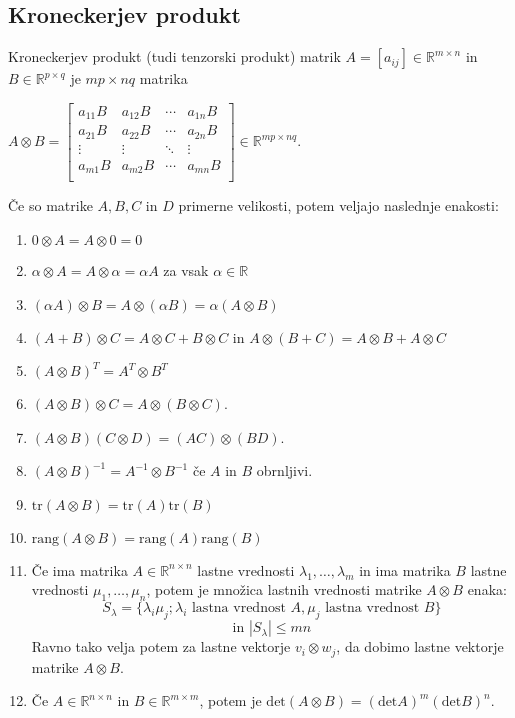 \documentclass{article}
\begin{document}
\begin{multicols}{2}
\subsection{Kroneckerjev produkt}

Kroneckerjev produkt (tudi tenzorski produkt) matrik \( A = [a_{ij}] \in \mathbb{R}^{m \times n} \) in \( B \in \mathbb{R}^{p \times q} \) je \( mp \times nq \) matrika

\begin{math}
A \otimes B = 
\begin{bmatrix}
a_{11}B & a_{12}B & \cdots & a_{1n}B \\
a_{21}B & a_{22}B & \cdots & a_{2n}B \\
\vdots  & \vdots  & \ddots & \vdots  \\
a_{m1}B & a_{m2}B & \cdots & a_{mn}B \\
\end{bmatrix}
\in \mathbb{R}^{mp \times nq}.
\end{math}

Če so matrike $A, B, C$ in $D$ primerne velikosti, potem veljajo naslednje enakosti:
\begin{enumerate}
\item $0 \otimes A = A \otimes 0 = 0$
\item $\alpha \otimes A = A \otimes \alpha = \alpha A$ za vsak $\alpha \in \mathbb{R}$
\item $(\alpha A) \otimes B = A \otimes (\alpha B) = \alpha (A \otimes B)$
\item $(A + B) \otimes C = A \otimes C + B \otimes C$ in $A \otimes (B + C) = A \otimes B + A \otimes C$
\item $(A \otimes B)^T = A^T \otimes B^T$
\item $(A \otimes B) \otimes C = A \otimes (B \otimes C)$.
\item $(A \otimes B)(C \otimes D) = (AC) \otimes (BD)$.
\item $(A \otimes B)^{-1} = A^{-1} \otimes B^{-1}$ če $A$ in $B$ obrnljivi.
\item $\text{tr}(A \otimes B) = \text{tr}(A) \text{tr}(B)$
\item $\text{rang}(A \otimes B) = \text{rang}(A) \text{rang}(B)$
\item Če ima matrika $A \in \mathbb{R}^{n \times n}$ lastne vrednosti $\lambda_1, \ldots, \lambda_m$ in ima matrika $B$ lastne vrednosti $\mu_1, \ldots, \mu_n$, potem je množica lastnih vrednosti matrike $A \otimes B$ enaka:
$$ S_\lambda  = \{ \lambda_i \mu_j; \lambda_i \text{ lastna vrednost } A, \mu_j \text{ lastna vrednost } B\} $$
$$\text{in } |S_\lambda| \leq mn$$
Ravno tako velja potem za lastne vektorje $ v_i \otimes w_j$, da dobimo lastne vektorje matrike $A \otimes B$.
\item Če $A \in \mathbb{R}^{n \times n}$ in $B \in \mathbb{R}^{m \times m}$, potem je $\text{det}(A \otimes B) = (\text{det} A)^m(\text{det} B)^n.$
\end{enumerate}


\end{multicols}
\end{document}
